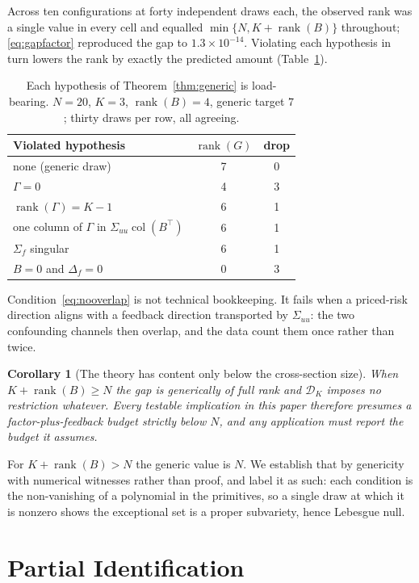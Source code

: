 \documentclass[10pt,twocolumn]{article}
\newtheorem{corollary}{Corollary}
\theoremstyle{remark}
\newcommand{\rank}{\operatorname{rank}}
\newcommand{\col}{\operatorname{col}}
\begin{document}
Across ten configurations at forty independent draws each, the observed rank
was a single value in every cell and equalled $\min\{N,K+\rank(B)\}$ throughout;
\eqref{eq:gapfactor} reproduced the gap to $1.3\times10^{-14}$. Violating each
hypothesis in turn lowers the rank by exactly the predicted amount
(Table~\ref{tab:exceptional}).

\begin{table}[t]
\centering
\small
\caption{Each hypothesis of Theorem~\ref{thm:generic} is load-bearing.
$N=20$, $K=3$, $\rank(B)=4$, generic target $7$; thirty draws per row, all
agreeing.}
\label{tab:exceptional}
\begin{tabular}{lcc}
\toprule
Violated hypothesis & $\rank(G)$ & drop \\
\midrule
none (generic draw) & 7 & 0 \\
$\Gamma=0$ & 4 & 3 \\
$\rank(\Gamma)=K-1$ & 6 & 1 \\
one column of $\Gamma$ in $\Sigma_{uu}\col(B^\top)$ & 6 & 1 \\
$\Sigma_f$ singular & 6 & 1 \\
$B=0$ and $\Delta_f=0$ & 0 & 3 \\
\bottomrule
\end{tabular}
\end{table}

Condition~\eqref{eq:nooverlap} is not technical bookkeeping. It fails when a
priced-risk direction aligns with a feedback direction transported by
$\Sigma_{uu}$: the two confounding channels then overlap, and the data count
them once rather than twice.

\begin{corollary}[The theory has content only below the cross-section size]
\label{cor:empty}
When $K+\rank(B)\ge N$ the gap is generically of full rank and $\mathcal D_K$
imposes no restriction whatever. Every testable implication in this paper
therefore presumes a factor-plus-feedback budget strictly below $N$, and any
application must report the budget it assumes.
\end{corollary}

For $K+\rank(B)>N$ the generic value is $N$. We establish that by genericity
with numerical witnesses rather than proof, and label it as such: each
condition is the non-vanishing of a polynomial in the primitives, so a single
draw at which it is nonzero shows the exceptional set is a proper subvariety,
hence Lebesgue null.

\section{Partial Identification}
\label{sec:partial}
\end{document}
